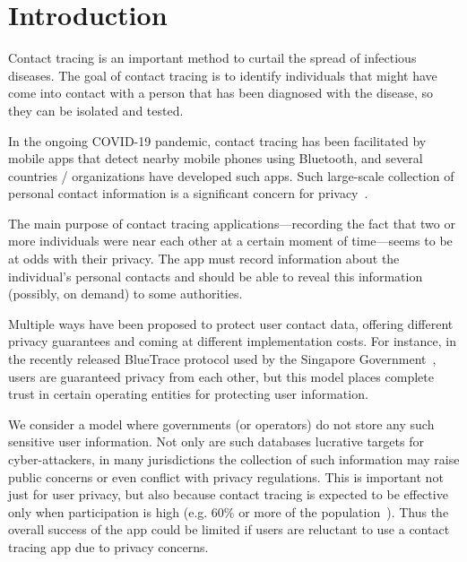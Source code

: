 \documentclass[11pt]{article} %
\newcommand{\remove}[1]{}
\begin{document}
\section{Introduction}
\label{sec:intro}

Contact tracing is an important method to curtail the spread of
infectious diseases. The goal of contact tracing is to identify
individuals that might have come into contact with a person that has been diagnosed with the disease, so they can be isolated and tested.

In the ongoing COVID-19 pandemic, contact tracing has been
facilitated by mobile apps that detect nearby mobile phones using Bluetooth, and several countries / organizations have developed such apps. Such large-scale collection of personal contact
information is a significant concern for privacy~\cite{cdc, cho2020contact,shokri2011quantifying}.

The main purpose of contact tracing applications---recording the fact that two or more individuals were near each other at a certain moment of time---seems to be at odds with their privacy. The
app must record information about the individual's personal contacts and should be able to reveal this information (possibly, on demand) to some authorities. 

\remove{
\todo{KMS: I think we can remove the rest of this paragraph}

In a fully untrusted environment one should expect any
participant to behave adversarially with the goal to exploit others'
personal information. Further, both end users of tracing
apps as well as the authorities using the collected data can become victims of security attacks, which can allow powerful
adversaries to misuse the information collected by the app. 
}


Multiple ways have been proposed to protect user contact data,
offering different privacy guarantees and coming at different
implementation costs. For instance, in the recently released BlueTrace protocol used by the Singapore Government~\cite{ttg}, users are guaranteed privacy from each other, but this model places complete trust in certain operating entities for protecting user information.

\remove{We analyze the BlueTrace proposal and other approaches in more detail in Section~\ref{subs:rel_work_ct}.}

We consider a model where governments (or operators) do not store any such sensitive user information. Not only are such databases lucrative targets for cyber-attackers, in many jurisdictions the collection of such information may raise public concerns or even conflict with privacy regulations. This is important not just for user privacy, but also because contact tracing is expected to be effective only when participation is high (e.g. 60\% or more of the population~\cite{Ferretti2020}). Thus the overall success of the app could be limited if users are reluctant to use a contact tracing app due to privacy concerns.
\end{document}
